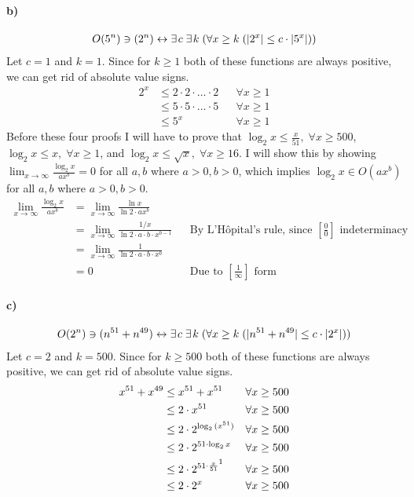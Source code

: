 \documentclass[12pt]{article}
\newcommand\+{\mkern2mu}
\begin{document}
\paragraph{b)} %
\begin{gather*}
O(5^n) \ni (2^n) \leftrightarrow \exists \+ c \; \exists \+ k \; (\forall x \geq k \; (\vert 2^x \vert \leq c \cdot \vert 5^x \vert))
\end{gather*}
Let $c = 1$ and $k = 1$.
Since for $k \geq 1$ both of these functions are always positive, we can get rid of absolute value signs.
\begin{align*}
2^x &\leq 2 \cdot 2 \cdot \dotso \cdot 2 && \forall x \geq 1 \\
&\leq 5 \cdot 5 \cdot \dotso \cdot 5 && \forall x \geq 1 \\
&\leq 5^x && \forall x \geq 1
\end{align*}
Before these four proofs I will have to prove that $\log_2{x} \leq \frac{x}{51}, \; \forall x \geq 500$, $\log_2{x} \leq x, \; \forall x \geq 1$, and $\log_2{x} \leq \sqrt{x}, \; \forall x \geq 16$.
I will show this by showing $\displaystyle\lim_{x \to \infty} \tfrac{\log_2{x}}{ax^b} = 0$ for all $a, b$ where $a > 0, b > 0$, which implies $\log_2{x} \in O(ax^b)$ for all $a, b$ where $a > 0, b > 0$.
\begin{align*}
\displaystyle\lim_{x \to \infty} \tfrac{\log_2{x}}{ax^b} &= \displaystyle\lim_{x \to \infty} \tfrac{\ln{x}}{\ln{2} \cdot ax^b}\\
&= \displaystyle\lim_{x \to \infty} \tfrac{1/x}{\ln{2} \cdot a \cdot b \cdot x^{b-1}} && \text{By L'Hôpital's rule, since $[\tfrac{0}{0}]$ indeterminacy} \\
&= \displaystyle\lim_{x \to \infty} \tfrac{1}{\ln{2} \cdot a \cdot b \cdot x^b} \\
&= 0 && \text{Due to $[\tfrac{1}{\infty}]$ form}
\end{align*}
\paragraph{c)}
\begin{gather*}
O(2^n) \ni (n^{51}+n^{49}) \leftrightarrow \exists \+ c \; \exists \+ k \; (\forall x \geq k \; (\vert n^{51}+n^{49} \vert \leq c \cdot \vert 2^x \vert))
\end{gather*}
Let $c = 2$ and $k = 500$.
Since for $k \geq 500$ both of these functions are always positive, we can get rid of absolute value signs.
\begin{align*}
x^{51}+x^{49} &\leq x^{51}+x^{51} && \forall x \geq 500 \\
&\leq 2 \cdot x^{51} && \forall x \geq 500 \\
&\leq 2 \cdot 2^{\log_2{(x^{51})}} && \forall x \geq 500 \\
&\leq 2 \cdot 2^{51 \cdot \log_2{x}} && \forall x \geq 500 \\
&\leq 2 \cdot 2^{51 \cdot \frac{x}{51}\footnotemark} && \forall x \geq 500 \\
&\leq 2 \cdot 2^{x} && \forall x \geq 500
\end{align*}
\end{document}
